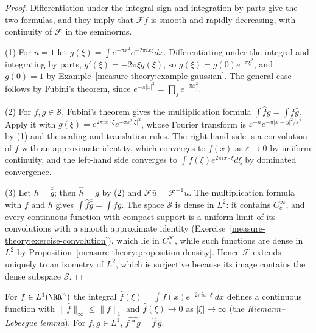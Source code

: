 \begin{proof}
Differentiation under the integral sign and integration by parts give the two formulas, and they imply that $\mathcal{F}f$ is smooth and rapidly decreasing, with continuity of $\mathcal{F}$ in the seminorms.

(1) For $n = 1$ let $g(\xi) = \int e^{-\pi x^2}e^{-2\pi ix\xi}dx$. Differentiating under the integral and integrating by parts, $g'(\xi) = -2\pi\xi g(\xi)$, so $g(\xi) = g(0)e^{-\pi\xi^2}$, and $g(0) = 1$ by
Example~\ref{measure-theory:example-gaussian}. The general case follows by Fubini's theorem, since $e^{-\pi|x|^2} = \prod_je^{-\pi x_j^2}$.

(2) For $f, g \in \mathcal{S}$, Fubini's theorem gives the multiplication formula $\int\hat fg = \int f\hat g$. Apply it with $g(\xi) = e^{2\pi ix\cdot\xi}e^{-\pi\varepsilon^2|\xi|^2}$, whose Fourier transform is
$\varepsilon^{-n}e^{-\pi|x - y|^2/\varepsilon^2}$ by (1) and the scaling and translation rules. The right-hand side is a convolution of $f$ with an approximate identity, which converges to $f(x)$ as
$\varepsilon \to 0$ by uniform continuity, and the left-hand side converges to $\int\hat f(\xi)e^{2\pi ix\cdot\xi}d\xi$ by dominated convergence.

(3) Let $h = \overline{\hat g}$; then $\hat h = \bar g$ by (2) and $\overline{\mathcal{F}\bar u} = \mathcal{F}^{-1}u$. The multiplication formula with $f$ and $h$ gives $\int\hat f\overline{\hat g} = \int f\bar g$.
The space $\mathcal{S}$ is dense in $L^2$: it contains $C_c^\infty$, and every continuous function with compact support is a uniform limit of its convolutions with a smooth approximate identity
(Exercise~\ref{measure-theory:exercise-convolution}), which lie in $C_c^\infty$, while such functions are dense in $L^2$ by Proposition~\ref{measure-theory:proposition-density}. Hence $\mathcal{F}$ extends
uniquely to an isometry of $L^2$,
which is surjective because its image contains the dense subspace $\mathcal{S}$.
\end{proof}

\begin{proposition}\label{distributions:proposition-fourier-l1}
For $f \in L^1(\RR^n)$ the integral $\hat f(\xi) = \int f(x)e^{-2\pi ix\cdot\xi}\,dx$ defines a continuous function with $\|\hat f\|_\infty \leq \|f\|_1$ and $\hat f(\xi) \to 0$ as $|\xi| \to \infty$ (the
\emph{Riemann--Lebesgue lemma}). For $f, g \in L^1$, $\widehat{f * g} = \hat f\,\hat g$.
\end{proposition}


